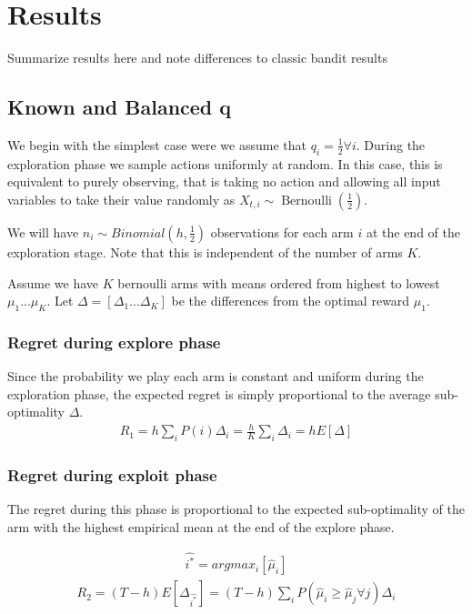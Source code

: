 \documentclass{article}
\newcommand{\eqn}[1]{\begin{align}#1\end{align}}
\newcommand{\Ber}{\operatorname{Bernoulli}}
\theoremstyle{plain}
\theoremstyle{definition}
\begin{document}
\section*{Results}

Summarize results here and note differences to classic bandit results

\subsection*{Known and Balanced q}

We begin with the simplest case were we assume that $q_i=\frac{1}{2} \forall i$. During the exploration phase we sample actions uniformly at random. In this case, this is equivalent to purely observing, that is taking no action and allowing all input variables to take their value randomly as  $X_{t,i} \sim \Ber(\frac{1}{2})$. 



We will have $n_i \sim Binomial(h,\frac{1}{2})$ observations for each arm $i$ at the end of the exploration stage. Note that this is independent of the number of arms $K$.



Assume we have $K$ bernoulli arms with means ordered from highest to lowest $\mu_1 ... \mu_K$. Let $\Delta = [\Delta_1...\Delta_K]$ be the differences from the optimal reward $\mu_1$. 



 

\subsubsection*{Regret during explore phase}
Since the probability we play each arm is constant and uniform during the exploration phase, the expected regret is simply proportional to the average sub-optimality $\Delta$.
\eqn{
R_1 = h\sum_i P(i)\Delta_i = \frac{h}{K}\sum_i \Delta_i = h E[\Delta]
}

\subsubsection*{Regret during exploit phase}
The regret during this phase is proportional to the expected sub-optimality of the arm with the highest empirical mean at the end of the explore phase.

\eqn{
\hat{i^*} = argmax_i [\hat{\mu}_i]
}
\eqn{
R_2 = (T-h)E[\Delta_{\hat{i^*}}] = (T-h)\sum_i P(\hat{\mu}_i \geq \hat{\mu}_j \forall j)\Delta_i 
}
\end{document}
